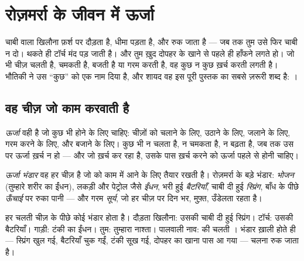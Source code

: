 \chapter{रोज़मर्रा के जीवन में ऊर्जा}\label{ch:g5:everyday-energy}

चाबी वाला खिलौना फ़र्श पर दौड़ता है, धीमा पड़ता है, और रुक जाता है ---
जब तक तुम उसे फिर चाबी न दो।  थकते ही टॉर्च मंद पड़ जाती है। और
तुम ख़ुद दोपहर के खाने से पहले ही हाँफने लगते हो। जो भी चीज़ चलती है,
चमकती है, बजती है या गरम करती है, वह कुछ न कुछ ख़र्च करती लगती है।
भौतिकी ने उस ``कुछ'' को एक नाम दिया है, और शायद वह इस पूरी पुस्तक का
सबसे ज़रूरी शब्द है: ।

\section{वह चीज़ जो काम करवाती है}

\begin{definition}[ऊर्जा]\label{def:g5:everyday-energy:energy}
\emph{ऊर्जा} वही है जो कुछ भी होने के लिए चाहिए: चीज़ों
को चलाने के लिए, उठाने के लिए, जलाने के लिए, गरम करने के लिए, और
बजाने के लिए। कुछ भी न चलता है, न चमकता है, न बढ़ता है, जब तक उस पर
ऊर्जा ख़र्च न हो --- और जो ख़र्च कर रहा है, उसके पास ख़र्च करने को
ऊर्जा पहले से होनी चाहिए।
\end{definition}

\begin{definition}[ऊर्जा भंडार]\label{def:g5:everyday-energy:store}
\emph{ऊर्जा भंडार} वह हर चीज़ है जो  को काम
में आने के लिए तैयार रखती है। रोज़मर्रा के बड़े भंडार:
\emph{भोजन} (तुम्हारे शरीर का ईंधन), लकड़ी और पेट्रोल जैसे
\emph{ईंधन}, भरी हुई \emph{बैटरियाँ}, चाबी दी हुई \emph{स्प्रिंग},
बाँध के पीछे \emph{ऊँचाई} पर रुका पानी --- और गरम \emph{सूर्य}, जो
हर चीज़ पर दिन भर, मुफ़्त,  उँडेलता रहता है।
\end{definition}

\begin{example}[भंडार पहचानो]\label{ex:g5:everyday-energy:spot}
हर चलती चीज़ के पीछे कोई भंडार होता है। दौड़ता खिलौना: उसकी चाबी दी
हुई स्प्रिंग। टॉर्च: उसकी बैटरियाँ। गाड़ी: टंकी का ईंधन। तुम:
तुम्हारा नाश्ता। पालवाली नाव:  की चलती । भंडार ख़ाली होते ही
--- स्प्रिंग खुल गई, बैटरियाँ चुक गईं, टंकी सूख गई, दोपहर का खाना
पास आ गया --- चलना रुक जाता है।
\end{example}

